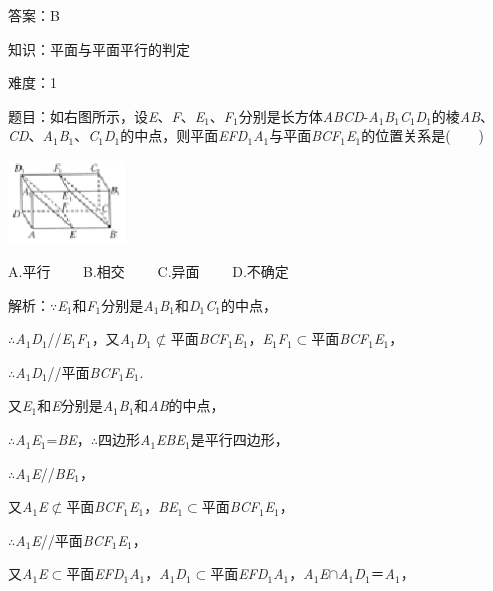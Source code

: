 \documentclass{article} %
\begin{document}
答案：B

知识：平面与平面平行的判定

难度：1

题目：如右图所示，设\textit{E}、\textit{F}、\textit{E}${}_{1}$、\textit{F}${}_{1}$分别是长方体\textit{ABCD}-\textit{A}${}_{1}$\textit{B}${}_{1}$\textit{C}${}_{1}$\textit{D}${}_{1}$的棱\textit{AB}、\textit{CD}、\textit{A}${}_{1}$\textit{B}${}_{1}$、\textit{C}${}_{1}$\textit{D}${}_{1}$的中点，则平面\textit{EFD}${}_{1}$\textit{A}${}_{1}$与平面\textit{BCF}${}_{1}$\textit{E}${}_{1}$的位置关系是(　　)

\includegraphics*[width=1.23in, height=0.87in, keepaspectratio=false]{image147}

A.平行　　 B.相交　　 C.异面　　 D.不确定

解析：$\mathrm{\because}$\textit{E}${}_{1}$和\textit{F}${}_{1}$分别是\textit{A}${}_{1}$\textit{B}${}_{1}$和\textit{D}${}_{1}$\textit{C}${}_{1}$的中点，

$\mathrm{\therefore}$\textit{A}${}_{1}$\textit{D}${}_{1}$//\textit{E}${}_{1}$\textit{F}${}_{1}$，又\textit{A}${}_{1}$\textit{D}${}_{1}$$\mathrm{\nsubset}$平面\textit{BCF}${}_{1}$\textit{E}${}_{1}$，\textit{E}${}_{1}$\textit{F}${}_{1}$$\mathrm{\subset }$平面\textit{BCF}${}_{1}$\textit{E}${}_{1}$，

$\mathrm{\therefore}$\textit{A}${}_{1}$\textit{D}${}_{1}$//平面\textit{BCF}${}_{1}$\textit{E}${}_{1}$.

又\textit{E}${}_{1}$和\textit{E}分别是\textit{A}${}_{1}$\textit{B}${}_{1}$和\textit{AB}的中点，

$\mathrm{\therefore}$\textit{A}${}_{1}$\textit{E}${}_{1}$=\textit{BE}，$\mathrm{\therefore}$四边形\textit{A}${}_{1}$\textit{EBE}${}_{1}$是平行四边形，

$\mathrm{\therefore}$\textit{A}${}_{1}$\textit{E}//\textit{BE}${}_{1}$，

又\textit{A}${}_{1}$\textit{E}$\mathrm{\nsubset}$平面\textit{BCF}${}_{1}$\textit{E}${}_{1}$，\textit{BE}${}_{1}$$\mathrm{\subset }$平面\textit{BCF}${}_{1}$\textit{E}${}_{1}$，

$\mathrm{\therefore}$\textit{A}${}_{1}$\textit{E}//平面\textit{BCF}${}_{1}$\textit{E}${}_{1}$，

又\textit{A}${}_{1}$\textit{E}$\mathrm{\subset }$平面\textit{EFD}${}_{1}$\textit{A}${}_{1}$，\textit{A}${}_{1}$\textit{D}${}_{1}$$\mathrm{\subset }$平面\textit{EFD}${}_{1}$\textit{A}${}_{1}$，\textit{A}${}_{1}$\textit{E}$\mathrm{\cap}$\textit{A}${}_{1}$\textit{D}${}_{1}$＝\textit{A}${}_{1}$，
\end{document}
